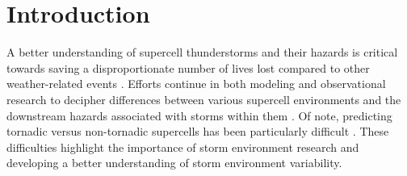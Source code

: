 \chapter{Introduction}
\label{chap:intro}





A better understanding of supercell thunderstorms and their hazards is critical towards saving a disproportionate number of lives lost compared to other weather-related events \citep{brotzge2013tornado}. Efforts continue in both modeling and observational research to decipher differences between various supercell environments and the downstream hazards associated with storms within them \cite[e.g.,][]{nowotarski2013classifying, parker2014composite, coffer2020near, coniglio2020insights}. Of note, predicting tornadic versus non-tornadic supercells has been particularly difficult \citep{brooks2018long}. These difficulties highlight the importance of storm environment research and developing a better understanding of storm environment variability.

